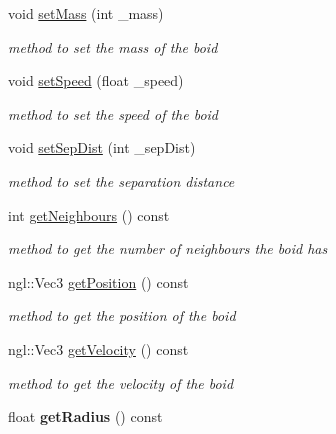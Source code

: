 \begin{DoxyCompactItemize}
void \hyperlink{classBoid_af9cc5ca3786b7a0c5fa7c6b61d257bde}{set\-Mass} (int \-\_\-mass)
\begin{DoxyCompactList}\small\item\em method to set the mass of the boid \end{DoxyCompactList}\item 
void \hyperlink{classBoid_a6a8b730efcf6b98cbf56aaa905bc7508}{set\-Speed} (float \-\_\-speed)
\begin{DoxyCompactList}\small\item\em method to set the speed of the boid \end{DoxyCompactList}\item 
void \hyperlink{classBoid_a8b2d2ef70003c3b46c22ec3866f842ec}{set\-Sep\-Dist} (int \-\_\-sep\-Dist)
\begin{DoxyCompactList}\small\item\em method to set the separation distance \end{DoxyCompactList}\item 
int \hyperlink{classBoid_ae4d6cb62f1811008b923e1d1bf349430}{get\-Neighbours} () const 
\begin{DoxyCompactList}\small\item\em method to get the number of neighbours the boid has \end{DoxyCompactList}\item 
ngl\-::\-Vec3 \hyperlink{classBoid_a8d92ae43f4b135661bb93afd46c90e94}{get\-Position} () const 
\begin{DoxyCompactList}\small\item\em method to get the position of the boid \end{DoxyCompactList}\item 
ngl\-::\-Vec3 \hyperlink{classBoid_a9b8109fd5bb93268c2591bf0b87a920d}{get\-Velocity} () const 
\begin{DoxyCompactList}\small\item\em method to get the velocity of the boid \end{DoxyCompactList}\item 
\hypertarget{classBoid_a5ff5c09aa0f501a097116a453013986f}{float {\bfseries get\-Radius} () const }\label{classBoid_a5ff5c09aa0f501a097116a453013986f}


\end{DoxyCompactItemize}
